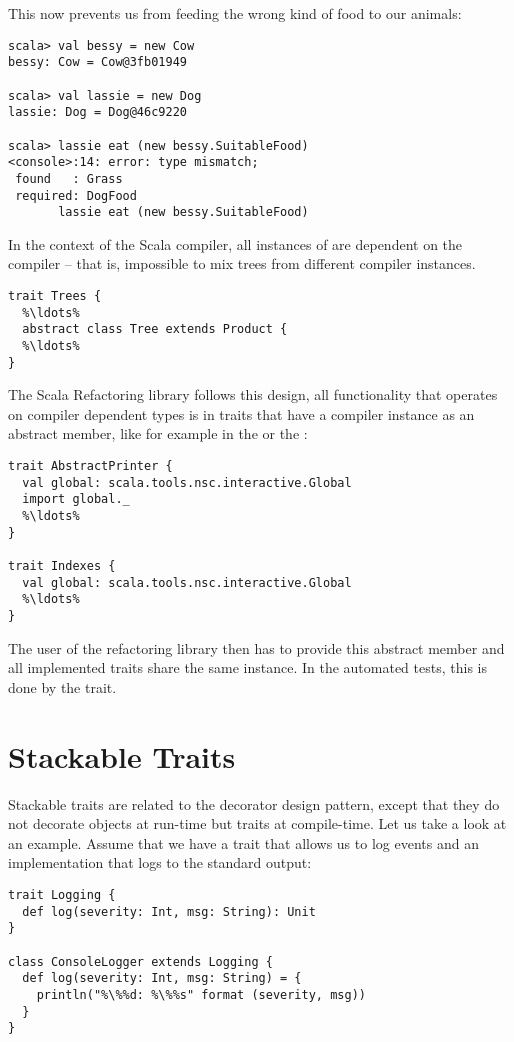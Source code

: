 \documentclass[10pt,a4paper,oneside]{scrreprt}
\begin{document}
This now prevents us from feeding the wrong kind of food to our animals:

\begin{lstlisting}
scala> val bessy = new Cow
bessy: Cow = Cow@3fb01949

scala> val lassie = new Dog
lassie: Dog = Dog@46c9220

scala> lassie eat (new bessy.SuitableFood)
<console>:14: error: type mismatch;
 found   : Grass
 required: DogFood
       lassie eat (new bessy.SuitableFood)
\end{lstlisting}

In the context of the Scala compiler, all instances of  are dependent on the compiler -- that is, impossible to mix trees from different compiler instances.

\begin{lstlisting}
trait Trees {
  %\ldots%
  abstract class Tree extends Product {
  %\ldots%
}
\end{lstlisting}

The Scala Refactoring library follows this design, all functionality that operates on compiler dependent types is in traits that have a compiler instance as an abstract member, like for example in the  or the :

\begin{lstlisting}
trait AbstractPrinter {
  val global: scala.tools.nsc.interactive.Global
  import global._
  %\ldots%
}

trait Indexes {
  val global: scala.tools.nsc.interactive.Global
  %\ldots%
}
\end{lstlisting}

The user of the refactoring library then has to provide this abstract member and all implemented traits share the same instance. In the automated tests, this is done by the  trait.

\section{Stackable Traits} \label{section:stackable-traits}

Stackable traits are related to the decorator design pattern, except that they do not decorate objects at run-time but traits at compile-time. Let us take a look at an example. Assume that we have a trait that allows us to log events and an implementation that logs to the standard output:

\begin{lstlisting}
trait Logging {
  def log(severity: Int, msg: String): Unit
}

class ConsoleLogger extends Logging {
  def log(severity: Int, msg: String) = {
    println("%\%%d: %\%%s" format (severity, msg))
  }
}
\end{lstlisting}
\end{document}
